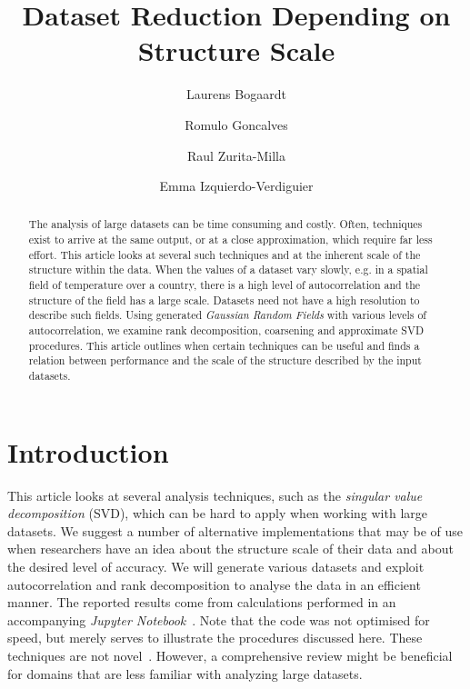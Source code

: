 \documentclass[sigconf]{acmart}
\begin{document}
\title{Dataset Reduction Depending on Structure Scale}

\author{Laurens Bogaardt}

\author{Romulo Goncalves}

\author{Raul Zurita-Milla}

\author{Emma Izquierdo-Verdiguier}

\begin{abstract}
The analysis of large datasets can be time consuming and costly. Often, techniques exist to arrive at the same output, or at a close approximation, which require far less effort. This article looks at several such techniques and at the inherent scale of the structure within the data. When the values of a dataset vary slowly, e.g. in a spatial field of temperature over a country, there is a high level of autocorrelation and the structure of the field has a large scale. Datasets need not have a high resolution to describe such fields. Using generated \textit{Gaussian Random Fields} with various levels of autocorrelation, we examine rank decomposition, coarsening and approximate SVD procedures. This article outlines when certain techniques can be useful and finds a relation between performance and the scale of the structure described by the input datasets.
\end{abstract}


\maketitle

\section{Introduction}
\label{sec:Introduction}

This article looks at several analysis techniques, such as the \textit{singular value decomposition} (SVD), which can be hard to apply when working with large datasets. We suggest a number of alternative implementations that may be of use when researchers have an idea about the structure scale of their data and about the desired level of accuracy. We will generate various datasets and exploit autocorrelation and rank decomposition to analyse the data in an efficient manner. The reported results come from calculations performed in an accompanying \textit{Jupyter Notebook}~\cite{Bogaardt2018}. Note that the code was not optimised for speed, but merely serves to illustrate the procedures discussed here. These techniques are not novel~\cite{Golub1970, Bjorck1973, Chan1982}. However, a comprehensive review might be beneficial for domains that are less familiar with analyzing large datasets.
\end{document}
